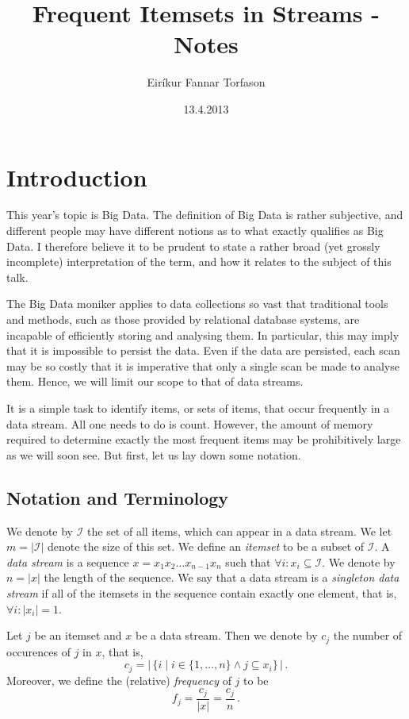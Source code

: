 \documentclass[landscape,twocolumn,a4paper]{article}
\author{Eir\'{i}kur Fannar Torfason}
\date{13.4.2013}
\title{Frequent Itemsets in Streams - Notes}
\begin{document}
\maketitle

\section{Introduction}
This year's topic is Big Data. The definition of Big Data is rather subjective, and different people may have different notions as to what exactly qualifies as Big Data. I therefore believe it to be prudent to state a rather broad (yet grossly incomplete) interpretation of the term, and how it relates to the subject of this talk.

The Big Data moniker applies to data collections so vast that traditional tools and methods, such as those provided by relational database systems, are incapable of efficiently storing and analysing them. In particular, this may imply that it is impossible to persist the data. Even if the data are persisted, each scan may be so costly that it is imperative that only a single scan be made to analyse them. Hence, we will limit our scope to that of data streams. %

It is a simple task to identify items, or sets of items, that occur frequently in a data stream. All one needs to do is count. However, the amount of memory required to determine exactly the most frequent items may be prohibitively large as we will soon see. But first, let us lay down some notation.

\subsection{Notation and Terminology}
We denote by $\mathcal{I}$ the set of all items, which can appear in a data stream. We let $m = |\mathcal{I}|$ denote the size of this set. We define an \textit{itemset} to be a subset of $\mathcal{I}$. A \textit{data stream} is a sequence $x = x_1 x_2 \dots x_{n-1} x_n$ such that $\forall i: x_i \subseteq \mathcal{I}$. We denote by $n = |x|$ the length of the sequence. We say that a data stream is a \textit{singleton data stream} if all of the itemsets in the sequence contain exactly one element, that is, $\forall i: |x_i| = 1$.

Let $j$ be an itemset and $x$ be a data stream. Then we denote by $c_j$ the number of occurences of $j$ in $x$, that is,
$$
c_j = \left| \, \{i \; | \; i \in \{1, \dots ,n\} \wedge j \subseteq x_i \} \, \right| \, .
$$
Moreover, we define the (relative) \textit{frequency} of $j$ to be 
$$
f_j = \frac{c_j}{|x|} = \frac{c_j}{n} \, .
$$
\end{document}
